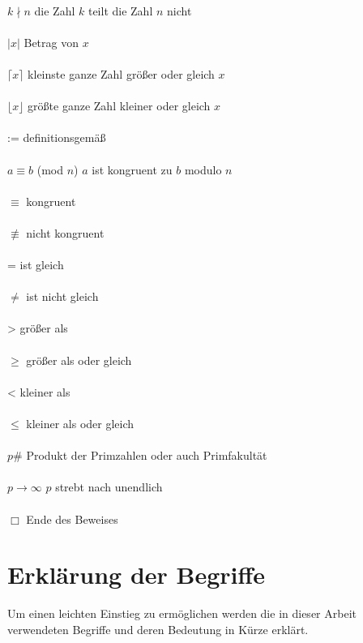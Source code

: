 \documentclass[12pt,a4paper]{article}
\theoremstyle{definition}
\begin{document}
\begin{tabbing}
\\$k \nmid n$             \> die Zahl $k$ teilt die Zahl $n$ nicht\\
\\$\vert x \vert$         \> Betrag von $x$\\
\\$\lceil{x}\rceil$       \> kleinste ganze Zahl größer oder gleich $x$\\
\\$\lfloor{x}\rfloor$     \> größte ganze Zahl kleiner oder gleich $x$ \\
\\:=                      \> definitionsgemäß\\
\\$a\equiv b$ (mod $n$)   \> $a$ ist kongruent zu $b$ modulo $n$\\
\\$\equiv$                \> kongruent\\
\\$\not\equiv$            \> nicht kongruent\\
\\=                       \> ist gleich\\
\\$\neq$                  \> ist nicht gleich\\
\\>                       \> größer als\\
\\$\geq$                  \> größer als oder gleich\\
\\<                       \> kleiner als\\
\\$\leq$                  \> kleiner als oder gleich\\
\\$p\#$                   \> Produkt der Primzahlen oder auch Primfakultät\\
\\$p \to \infty$          \> $p$ strebt nach unendlich\\
\\$\Box$                  \> Ende des Beweises

\end{tabbing}
\newpage

\section*{Erklärung der Begriffe}
Um einen leichten Einstieg zu ermöglichen werden die in dieser Arbeit verwendeten Begriffe und deren Bedeutung in Kürze erklärt.
\end{document}
